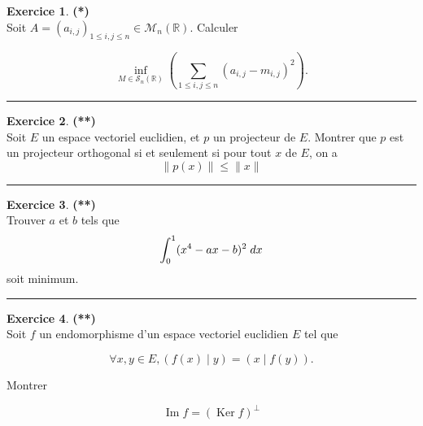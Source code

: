 \documentclass[a4paper,11pt]{article}
\theoremstyle{definition}
\newtheorem{exo}{Exercice} %
\begin{document}
\begin{minipage}{1\linewidth}\begin{minipage}[t]{0.48\linewidth}\raggedright
	
		
		\begin{exo}\textbf{(*)}\quad\\[0.2cm]
	Soit $A=\left(a_{i, j}\right)_{1 \leq i, j \leq n} \in \mathcal{M}_{n}(\mathbb{R})$. Calculer
	
	$$
	\inf _{M \in \mathcal{S}_{n}(\mathbb{R})}\left(\sum_{1 \leq i, j \leq n}\left(a_{i, j}-m_{i, j}\right)^{2}\right) .
	$$			
	
	\centering\rule{1\linewidth}{0.6pt}\end{exo}

\begin{exo}\textbf{(**)}\quad\\[0.2cm]
	Soit $E$ un espace vectoriel euclidien, et $p$ un projecteur de $E$. Montrer que $p$ est un projecteur orthogonal
	si et seulement si pour tout $x$ de $E$, on a $$\|p(x)\|\leq \|x\|$$
	
	\centering\rule{1\linewidth}{0.6pt}\end{exo}	

		
\begin{exo}\textbf{(**)}\quad\\[0.2cm]
	 Trouver $a$ et $b$ tels que $$\displaystyle\int_{0}^{1}(x^4-ax-b)^2\;dx$$ soit minimum. 
	
	\centering\rule{1\linewidth}{0.6pt}\end{exo}

	








\end{minipage}\hfill\vrule\hfill\begin{minipage}[t]{0.48\linewidth}\raggedright


\begin{exo}\textbf{(**)}\quad\\[0.2cm]
	
	Soit $f$ un endomorphisme d'un espace vectoriel euclidien $E$ tel que
	
	$$
	\forall x, y \in E,(f(x) \mid y)=(x \mid f(y)) .
	$$
	
	Montrer
	
	$$
	\operatorname{Im} f=(\operatorname{Ker} f)^{\perp}
	$$
	

\end{exo}
\end{minipage}
\end{minipage}
\end{document}
